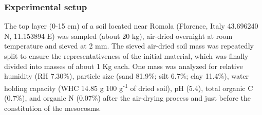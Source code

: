 \subsubsection{Experimental setup}
The top layer (0-15 cm) of a soil located near Romola (Florence, Italy 43.696240 N, 11.153894 E) was sampled (about 20 kg), air-dried overnight at room temperature and sieved at 2 mm. The sieved air-dried soil mass was repeatedly split to ensure the representativeness of the initial material, which was finally divided into masses of about 1 Kg each. One mass was analyzed for relative humidity (RH 7.30\%), particle size (sand 81.9\%; silt 6.7\%; clay 11.4\%), water holding capacity (WHC 14.85 g 100 g\textsuperscript{-1} of dried soil), pH (5.4), total organic C (0.7\%), and organic N (0.07\%) after the air-drying process and just before the constitution of the mesocosms.\\

